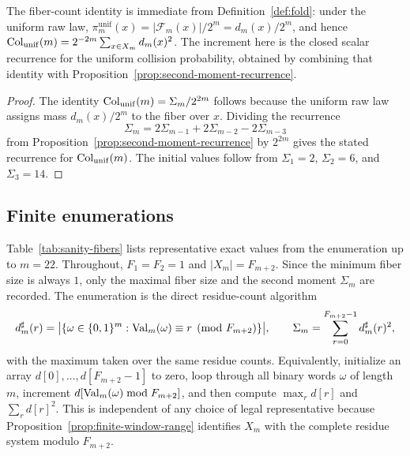 \begin{remark}
The fiber-count identity is immediate from Definition~\ref{def:fold}: under
the uniform raw law,
$\pi_m^{\mathrm{unif}}(x)=|\mathcal F_m(x)|/2^m=d_m(x)/2^m$, and hence
$\mathrm{Col}_{\mathrm{unif}}(m)=2^{-2m}\sum_{x\in X_m}d_m(x)^2$. The increment here
is the closed scalar recurrence for the uniform collision probability,
obtained by combining that identity with
Proposition~\ref{prop:second-moment-recurrence}.
\end{remark}

\begin{proof}
The identity $\mathrm{Col}_{\mathrm{unif}}(m)=\Sigma_m/2^{2m}$ follows because the
uniform raw law assigns mass $d_m(x)/2^m$ to the fiber over $x$. Dividing the
recurrence
\[
\Sigma_m=2\Sigma_{m-1}+2\Sigma_{m-2}-2\Sigma_{m-3}
\]
from Proposition~\ref{prop:second-moment-recurrence} by $2^{2m}$ gives the stated
recurrence for $\mathrm{Col}_{\mathrm{unif}}(m)$. The initial values follow from
$\Sigma_1=2$, $\Sigma_2=6$, and $\Sigma_3=14$.
\end{proof}

\subsection{Finite enumerations}\label{sec:fiber-enumerations}

Table~\ref{tab:sanity-fibers} lists representative exact values from the enumeration up to $m=22$. Throughout, $F_1=F_2=1$ and $|X_m|=F_{m+2}$. Since the minimum fiber size is always $1$, only the maximal fiber size and the second moment $\Sigma_m$ are recorded. The enumeration is the direct residue-count algorithm
\[
d_m^\sharp(r)=
\bigl|\{\omega\in\{0,1\}^m:\mathrm{Val}_m(\omega)\equiv r\pmod {F_{m+2}}\}\bigr|,
\qquad
\Sigma_m=\sum_{r=0}^{F_{m+2}-1}d_m^\sharp(r)^2,
\]
with the maximum taken over the same residue counts. Equivalently, initialize
an array $d[0],\ldots,d[F_{m+2}-1]$ to zero, loop through all binary words
$\omega$ of length $m$, increment
$d[\mathrm{Val}_m(\omega)\bmod F_{m+2}]$, and then compute $\max_r d[r]$ and
$\sum_r d[r]^2$. This is independent of any choice of legal representative
because Proposition~\ref{prop:finite-window-range} identifies $X_m$ with the
complete residue system modulo $F_{m+2}$.

